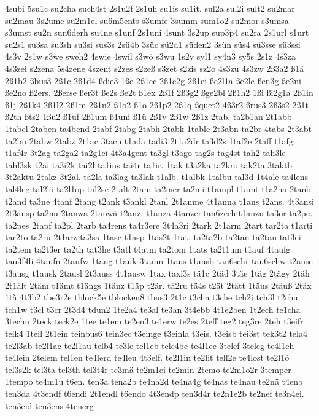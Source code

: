 {4subi
5su1c
su2cha
such4st
2s1u2f
2s1uh
su1is
su1it.
sul2a
sul2i
sult2
su2mar
su2mau
3s2ume
su2m1el
su6m5ents
s3umfe
3summ
sum1o2
su2mor
s3umsa
s3umst
su2n
sun6derh
su4ne
s1unf
2s1uni
4sunt
3s2up
sup3p4
su2ra
2s1url
s1urt
su2s1
su3sa
su3sh
su3si
sus3s
2sü4b
3süc
sü2d1
süden2
3sün
süs4
sü3sse
sü3ssi
4s3v
2s1w
s3we
sweh2
4swie
4swil
s3wö
s3wu
1s2y
syl1
sy4n3
sy5s
2s1z
4s3za
4s3zei
s2zena
5s4zene
4szent
s2zes
s2zeß
s3zet
s2zis
sz2o
4s3zu
4s3zw
2ß3a2
ß1ä
2ß1b2
ßbus3
2ß1c
2ß1d4
ßdie3
1ße
2ß1ec
2ß1e2g
2ß1ei
ße2l1a
ße2le
ßen3g
ße2ni
ße2no
ß2ers.
2ßerse
ßer3t
ße2s
ße2t
ß1ex
2ß1f
2ß3g2
ßge2bl
2ß1h2
1ßi
ßi2g1a
2ß1in
ß1j
2ß1k4
2ß1l2
2ß1m
2ß1n2
ß1o2
ß1ö
2ß1p2
2ß1q
ßquet2
4ß3r2
ßrus3
2ß3s2
2ß1t
ß2th
ßts2
1ßu2
ß1uf
2ß1um
ß1uni
ß1ü
2ß1v
2ß1w
2ß1z
2tab.
ta2b1an
2t1abb
1tabel
2taben
ta4bend
2tabf
2tabg
2tabh
2tabk
1table
2t3abn
ta2br
4tabs
2t3abt
ta2bü
2tabw
2tabz
2t1ac
3tacu
t1ada
tadi3
2t1a2dr
ta3d2s
1taf2e
2taff
t1afg
t1af4r
3t2ag
ta2ga2
ta2g1ei
4t3a4gent
ta3gl
t3ago
tag2s
tag4st
tah2
tah3le
tahl3sk
t2ai
ta3i2k
tai2l
ta1ins
tai4r
ta1ir.
1tak
t3a2ka
ta2kro
tak2ta
3taktb
3t2aktu
2takz
3t2al.
ta2la
ta3lag
ta3lak
t1alb.
t1albk
1talbu
tal3d
1t4ale
ta4lens
tal4leg
tal2lö
ta2l1op
tal2se
2talt
2tam
ta2mer
ta2mi
t1ampl
t1amt
t1a2na
2tanb
t2and
ta3ne
4tanf
2tang
t2ank
t3ankl
2tanl
2t1anme
4t1anna
t1ans
t2ans.
4t3ansi
2t3ansp
ta2nu
2tanwa
2tanwä
t2anz.
t1anza
4tanzei
tan6zerh
t1anzu
ta3or
ta2pe.
ta2pes
2tapf
ta2pl
2tarb
ta4rens
ta4r3ere
3t4a3ri
2tark
2t1arm
2tart
tar2ta
t1arti
tar2to
ta2ru
2t1arz
ta3sa
1tasc
t1asp
1tas2t
1tat.
ta2ta2b
ta2tan
ta2tau
tat3ei
ta2tem
ta2t3er
ta2th
tat3he
t3atl
t4atm
ta2tom
1tats
ta2t1um
t1auf
4taufg
tau3f4li
4taufn
2taufw
1taug
t1auk
3taum
1taus
t1ausb
tau6schr
tau6schw
t2ause
t3ausg
t1ausk
2tausl
2t3auss
4t1ausw
1tax
taxi3s
tä1c
2täd
3täe
1täg
2tägy
2täh
2t1ält
2täm
t1ämt
t1ängs
1tänz
t1äp
t2är.
tä2ru
tä4s
t2ät
2tätt
1täus
2täuß
2täx
1tà
4t3b2
tbe3r2e
tblock5e
tblocken8
tbus3
2t1c
t3cha
t3che
tch2i
tch3l
t2chu
tch1w
t3cl
t3cr
2t3d4
tdun2
1te2a4
te3al
te3an
3t4ebb
4t1e2ben
1t2ech
te1cha
3techn
2teck
teck2e
1tee
te1em
te2en3
te1erw
te2es
2teff
teg2
teg3re
2teh
t3eifr
teik4
1teil
2t1ein
teinbus6
tein3ec
t3einge
t3einla
t3eis.
t3eisb
tei3st
tek3t2
tela4
te2l3ab
te2l1ac
te2l1au
telb4
te3le
tel1eb
tele4be
te4l1ec
3telef
3teleg
te4l1eh
te4lein
2telem
tel1en
te4lerd
te4leu
4t3elf.
te2l1in
te2lit
tell2e
te4lost
te2l1ö
tel3s2k
tel3ta
tel3th
tel3t4r
te3mä
te2m1ei
te2min
2temo
te2m1o2r
3temper
1tempo
te4m1u
t6en.
ten3a
tena2b
te4na2d
te4na4g
te4nas
te4nau
te2nä
t4enb
ten3da
4t3endf
t6endi
2t1endl
t6endo
4t3endp
ten3d4r
te2n1e2b
te2nef
te3n4ei.
ten3eid
ten3ens
4tenerg
}
